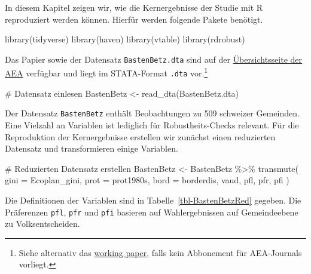 \documentclass[
  a4paper,
  DIV=11,
  oneside]{scrreprt}
\newenvironment{Shaded}{\begin{snugshade}}{\end{snugshade}}
\newcommand{\AttributeTok}[1]{\textcolor[rgb]{0.40,0.45,0.13}{#1}}
\newcommand{\CommentTok}[1]{\textcolor[rgb]{0.37,0.37,0.37}{#1}}
\newcommand{\FunctionTok}[1]{\textcolor[rgb]{0.28,0.35,0.67}{#1}}
\newcommand{\NormalTok}[1]{\textcolor[rgb]{0.00,0.23,0.31}{#1}}
\newcommand{\OtherTok}[1]{\textcolor[rgb]{0.00,0.23,0.31}{#1}}
\newcommand{\SpecialCharTok}[1]{\textcolor[rgb]{0.37,0.37,0.37}{#1}}
\newcommand{\StringTok}[1]{\textcolor[rgb]{0.13,0.47,0.30}{#1}}
\begin{document}
In diesem Kapitel zeigen wir, wie die Kernergebnisse der Studie mit R
reproduziert werden können. Hierfür werden folgende Pakete benötigt.

\begin{Shaded}
\begin{Highlighting}[]
\FunctionTok{library}\NormalTok{(tidyverse)}
\FunctionTok{library}\NormalTok{(haven)}
\FunctionTok{library}\NormalTok{(vtable)}
\FunctionTok{library}\NormalTok{(rdrobust)}
\end{Highlighting}
\end{Shaded}

Das Papier sowie der Datensatz \texttt{BastenBetz.dta} sind auf der
\href{https://www.aeaweb.org/articles?id=10.1257/pol.5.3.67}{Übersichtsseite
der AEA} verfügbar und liegt im STATA-Format \texttt{.dta}
vor.\footnote{Siehe alternativ das
  \href{https://papers.ssrn.com/sol3/papers.cfm?abstract_id=2133848}{working
  paper}, falls kein Abbonement für AEA-Journals vorliegt.}

\begin{Shaded}
\begin{Highlighting}[]
\CommentTok{\# Datensatz einlesen}
\NormalTok{BastenBetz }\OtherTok{\textless{}{-}} \FunctionTok{read\_dta}\NormalTok{(}\StringTok{\textquotesingle{}BastenBetz.dta\textquotesingle{}}\NormalTok{)}
\end{Highlighting}
\end{Shaded}

Der Datensatz \texttt{BastenBetz} enthält Beobachtungen zu 509 schweizer
Gemeinden. Eine Vielzahl an Variablen ist lediglich für
Robustheits-Checks relevant. Für die Reproduktion der Kernergebnisse
erstellen wir zunächst einen reduzierten Datensatz und transformieren
einige Variablen.

\begin{Shaded}
\begin{Highlighting}[]
\CommentTok{\# Reduzierten Datensatz erstellen}
\NormalTok{BastenBetz }\OtherTok{\textless{}{-}}\NormalTok{ BastenBetz }\SpecialCharTok{\%\textgreater{}\%}
  \FunctionTok{transmute}\NormalTok{(}
    \AttributeTok{gini =}\NormalTok{ Ecoplan\_gini,}
    \AttributeTok{prot =}\NormalTok{ prot1980s,}
    \AttributeTok{bord =}\NormalTok{ borderdis, }
\NormalTok{    vaud,}
\NormalTok{    pfl, }
\NormalTok{    pfr, }
\NormalTok{    pfi}
\NormalTok{  )}
\end{Highlighting}
\end{Shaded}

Die Definitionen der Variablen sind in Tabelle~\ref{tbl-BastenBetzRed}
gegeben. Die Präferenzen \texttt{pfl}, \texttt{pfr} und \texttt{pfi}
basieren auf Wahlergebnissen auf Gemeindeebene zu Volksentscheiden.
\end{document}
